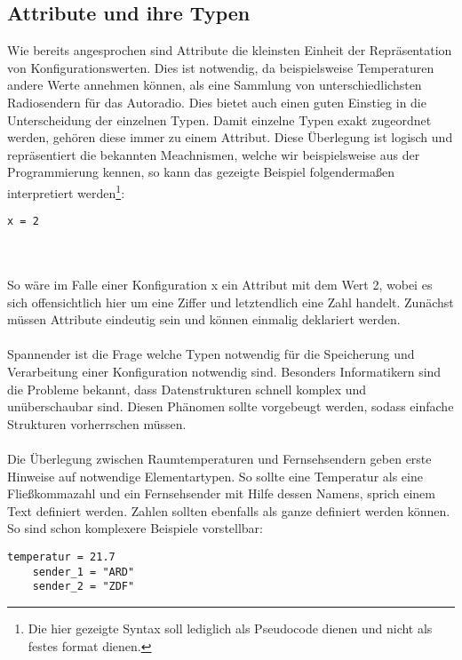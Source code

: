\subsection{Attribute und ihre Typen}
Wie bereits angesprochen sind Attribute die kleinsten Einheit der Repräsentation von Konfigurationswerten. Dies ist notwendig, da beispielsweise Temperaturen andere Werte annehmen können, als eine Sammlung von unterschiedlichsten Radiosendern für das Autoradio. Dies bietet auch einen guten Einstieg in die Unterscheidung der einzelnen Typen. Damit einzelne Typen exakt zugeordnet werden, gehören diese immer zu einem Attribut. Diese Überlegung ist logisch und repräsentiert die bekannten Meachnismen, welche wir beispielsweise aus der Programmierung kennen, so kann das gezeigte Beispiel folgendermaßen interpretiert werden\footnote{Die hier gezeigte Syntax soll lediglich als Pseudocode dienen und nicht als festes format dienen.}:
\lstset{language=bash}
\begin{lstlisting}[caption=Zuweisung eines Attributs als Pseudocode , captionpos=b]
   x = 2
\end{lstlisting}
	
\\\\

So wäre im Falle einer Konfiguration x ein Attribut mit dem Wert 2, wobei es sich offensichtlich hier um eine Ziffer und letztendlich eine Zahl handelt. Zunächst müssen Attribute eindeutig sein und können einmalig deklariert werden. 
\\\\
Spannender ist die Frage welche Typen notwendig für die  Speicherung und Verarbeitung einer Konfiguration notwendig sind. Besonders Informatikern sind die Probleme bekannt, dass Datenstrukturen schnell komplex und unüberschaubar sind. Diesen Phänomen sollte vorgebeugt werden, sodass einfache Strukturen vorherrschen müssen. 
\\\\
Die Überlegung zwischen Raumtemperaturen und Fernsehsendern geben erste Hinweise auf notwendige Elementartypen. So sollte eine Temperatur als eine Fließkommazahl und ein Fernsehsender mit Hilfe dessen Namens, sprich einem Text definiert werden. Zahlen sollten ebenfalls als ganze definiert werden können. So sind schon komplexere Beispiele vorstellbar:
\lstset{language=bash}
\begin{lstlisting}[caption=Zuweisung mehrerer Attribute, captionpos=b]
  temperatur = 21.7
	sender_1 = "ARD"
	sender_2 = "ZDF"
\end{lstlisting}


